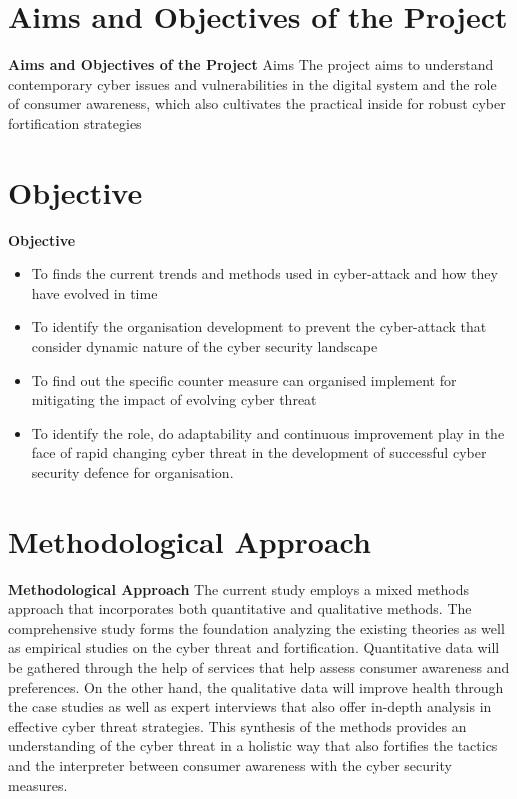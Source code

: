 
\section{Aims and Objectives of the Project}
\label{sec:into_back}
\textbf{Aims and Objectives of the Project}
Aims
The project aims to understand contemporary cyber issues and vulnerabilities in the digital system and the role of consumer awareness, which also cultivates the practical inside for robust cyber fortification strategies



\section{Objective}
\label{sec:into_back}
\textbf{Objective}
\begin{itemize}
    \item To finds the current trends and methods used in cyber-attack and how they have evolved in time
    \item To identify the organisation development to prevent the cyber-attack that consider dynamic nature of the cyber security landscape
    \item To find out the specific counter measure can organised implement for mitigating the impact of evolving cyber threat
    \item To identify the role, do adaptability and continuous improvement play in the face of rapid changing cyber threat in the development of successful cyber security defence for organisation.
\end{itemize}


\section{Methodological Approach}
\label{sec:into_back}
\textbf{Methodological Approach}
The current study employs a mixed methods approach that incorporates both quantitative and qualitative methods. The comprehensive study forms the foundation analyzing the existing theories as well as empirical studies on the cyber threat and fortification. Quantitative data will be gathered through the help of services that help assess consumer awareness and preferences. On the other hand, the qualitative data will improve health through the case studies as well as expert interviews that also offer in-depth analysis in effective cyber threat strategies. This synthesis of the methods provides an understanding of the cyber threat in a holistic way that also fortifies the tactics and the interpreter between consumer awareness with the cyber security measures.





